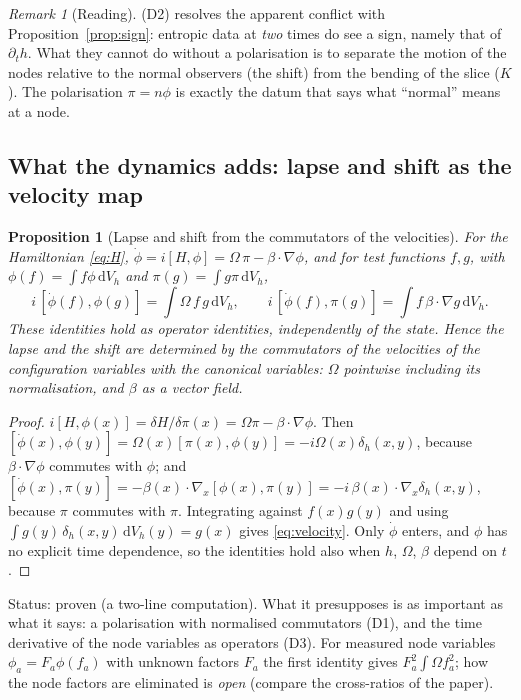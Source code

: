 \documentclass[a4paper,11pt]{article}
\newtheorem{proposition}[theorem]{Proposition}
\theoremstyle{definition}
\theoremstyle{remark}
\newtheorem{remark}[theorem]{Remark}
\newcommand{\dd}{\mathrm{d}}
\newcommand{\status}[1]{\par\noindent\textsf{\small Status: #1}\par}
\begin{document}
\begin{remark}[Reading]
\textup{(D2)} resolves the apparent conflict with Proposition~\ref{prop:sign}: entropic data at \emph{two} times do see a sign, namely that of $\partial_th$. What they cannot do without a polarisation is to separate the motion of the nodes relative to the normal observers (the shift) from the bending of the slice ($K$). The polarisation $\pi=n\phi$ is exactly the datum that says what ``normal'' means at a node.
\end{remark}

\subsection{What the dynamics adds: lapse and shift as the velocity map}

\begin{proposition}[Lapse and shift from the commutators of the velocities]\label{prop:velocity}
For the Hamiltonian \eqref{eq:H}, $\dot\phi=i[H,\phi]=\Omega\,\pi-\beta\cdot\nabla\phi$, and for test functions $f,g$, with $\phi(f)=\int f\phi\,\dd V_h$ and $\pi(g)=\int g\pi\,\dd V_h$,
\begin{equation}\label{eq:velocity}
i\,[\dot\phi(f),\phi(g)]=\int\Omega\,f\,g\,\dd V_h,\qquad i\,[\dot\phi(f),\pi(g)]=\int f\,\beta\cdot\nabla g\,\dd V_h .
\end{equation}
These identities hold as operator identities, independently of the state. Hence the lapse and the shift are determined by the commutators of the velocities of the configuration variables with the canonical variables: $\Omega$ pointwise including its normalisation, and $\beta$ as a vector field.
\end{proposition}

\begin{proof}
$i[H,\phi(x)]=\delta H/\delta\pi(x)=\Omega\pi-\beta\cdot\nabla\phi$. Then $[\dot\phi(x),\phi(y)]=\Omega(x)[\pi(x),\phi(y)]=-i\Omega(x)\delta_h(x,y)$, because $\beta\cdot\nabla\phi$ commutes with $\phi$; and $[\dot\phi(x),\pi(y)]=-\beta(x)\cdot\nabla_x[\phi(x),\pi(y)]=-i\,\beta(x)\cdot\nabla_x\delta_h(x,y)$, because $\pi$ commutes with $\pi$. Integrating against $f(x)g(y)$ and using $\int g(y)\,\delta_h(x,y)\,\dd V_h(y)=g(x)$ gives \eqref{eq:velocity}. Only $\dot\phi$ enters, and $\phi$ has no explicit time dependence, so the identities hold also when $h$, $\Omega$, $\beta$ depend on $t$.
\end{proof}
\status{proven (a two-line computation). What it presupposes is as important as what it says: a polarisation with normalised commutators (D1), and the time derivative of the node variables as operators (D3). For measured node variables $\phi_a=F_a\phi(f_a)$ with unknown factors $F_a$ the first identity gives $F_a^2\int\Omega f_a^2$; how the node factors are eliminated is \emph{open} (compare the cross-ratios of the paper).}
\end{document}

